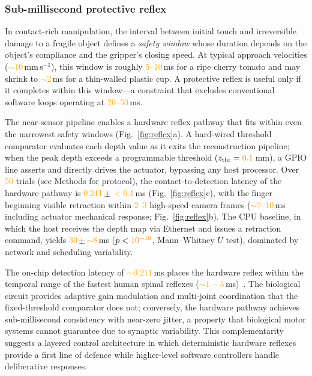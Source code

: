 \documentclass[10pt,a4paper]{article}
\newcommand{\placeholder}[1]{\textcolor{orange}{#1}}
\newcommand{\reflexFPGA}{\placeholder{0.211}}           %
\newcommand{\reflexCPU}{\placeholder{30}}             %
\begin{document}
\subsubsection*{Sub-millisecond protective reflex}

In contact-rich manipulation, the interval between initial touch and irreversible damage to a fragile object defines a \emph{safety window} whose duration depends on the object's compliance and the gripper's closing speed. At typical approach velocities (\placeholder{${\sim}10$}\,mm\,s$^{-1}$), this window is roughly \placeholder{5--10}\,ms for a ripe cherry tomato and may shrink to \placeholder{${\sim}2$}\,ms for a thin-walled plastic cup. A protective reflex is useful only if it completes within this window---a constraint that excludes conventional software loops operating at \placeholder{20--50}\,ms.

The near-sensor pipeline enables a hardware reflex pathway that fits within even the narrowest safety windows (Fig.~\ref{fig:reflex}a). A hard-wired threshold comparator evaluates each depth value as it exits the reconstruction pipeline; when the peak depth exceeds a programmable threshold ($z_\mathrm{thr} = \placeholder{0.1}$\,mm), a GPIO line asserts and directly drives the actuator, bypassing any host processor. Over \placeholder{50} trials (see Methods for protocol), the contact-to-detection latency of the hardware pathway is \reflexFPGA\,$\pm$\,\placeholder{$<$0.1}\,ms (Fig.~\ref{fig:reflex}c), with the finger beginning visible retraction within \placeholder{2--3} high-speed camera frames (\placeholder{${\sim}7$--10}\,ms including actuator mechanical response; Fig.~\ref{fig:reflex}b). The CPU baseline, in which the host receives the depth map via Ethernet and issues a retraction command, yields \reflexCPU\,$\pm$\,\placeholder{${\sim}8$}\,ms ($p < \placeholder{10^{-10}}$, Mann--Whitney $U$ test), dominated by network and scheduling variability.

The on-chip detection latency of \placeholder{${\sim}0.211$}\,ms places the hardware reflex within the temporal range of the fastest human spinal reflexes (\placeholder{${\sim}1{-}5$}\,ms)~\cite{johansson1984tactile}. The biological circuit provides adaptive gain modulation and multi-joint coordination that the fixed-threshold comparator does not; conversely, the hardware pathway achieves sub-millisecond consistency with near-zero jitter, a property that biological motor systems cannot guarantee due to synaptic variability. This complementarity suggests a layered control architecture in which deterministic hardware reflexes provide a first line of defence while higher-level software controllers handle deliberative responses.
\end{document}
